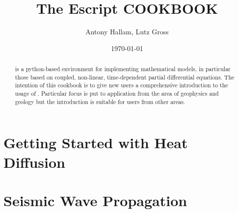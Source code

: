 \documentclass{manual}
\title{The Escript COOKBOOK}
\author{Antony Hallam, Lutz Gross}
\date{\today}
\begin{document}
\maketitle



\begin{abstract}
\esc is a python-based environment for implementing mathematical models, in particular those based on coupled, non-linear, time-dependent partial differential equations. The intention of this cookbook is to give new \esc users a comprehensive introduction to the usage of \esc. Particular focus is put to application from the 
area of geophysics and geology but the introduction is suitable for users from other areas.  
\end{abstract}
\tableofcontents

\newpage




\chapter{Getting Started with Heat Diffusion}





\chapter{Seismic Wave Propagation}

\end{document}
